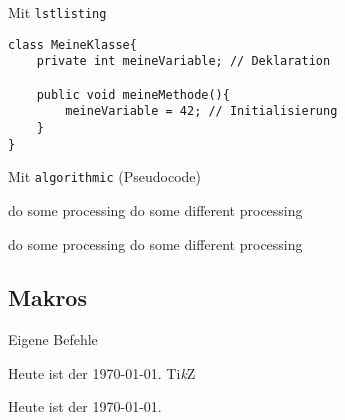 \documentclass{beamer}
\begin{document}
		
		\begin{frame}[containsverbatim]{Mit \texttt{lstlisting}}
			\begin{lstlisting}[caption=Variablen]
class MeineKlasse{
	private int meineVariable; // Deklaration
	
	public void meineMethode(){
		meineVariable = 42; // Initialisierung
	}
}
			\end{lstlisting}
		\end{frame}
		

		\begin{frame}[containsverbatim]{Mit \texttt{algorithmic} (Pseudocode)}
			\begin{smalllatexcode}
\begin{algorithmic}
        \STATE do some processing
        \STATE do some different processing
    \ENDIF
\end{algorithmic}		
			\end{smalllatexcode}

\begin{algorithmic}
        \STATE do some processing
        \STATE do some different processing
    \ENDIF
\end{algorithmic}		
		
		\end{frame}				
		
		
		\subsection{Makros}
		\begin{frame}[containsverbatim]{Eigene Befehle}
			\begin{latexcode}
\def\heute{Heute ist der \today.}
\newcommand{\heute}{Heute ist der \today.}
\newcommand{\TikZ}{Ti\textit{k}Z}
\heute
\TikZ
			\end{latexcode}
			Heute ist der \today.\\
			\TikZ
		\end{frame}
		
\end{document}
